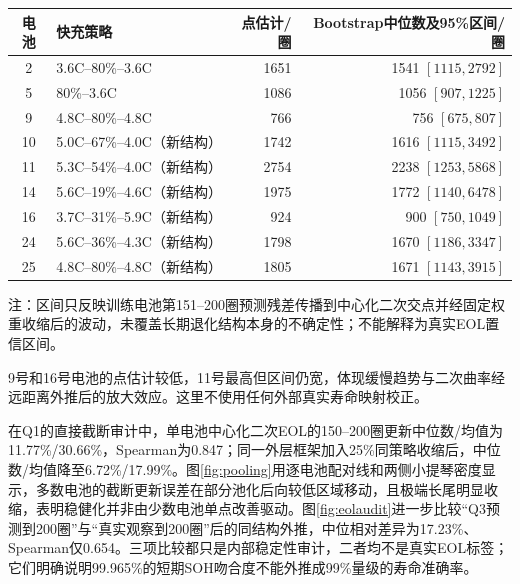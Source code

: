 \documentclass[withoutpreface]{cumcmthesis}
\begin{document}
\begin{table}[H]
\centering
\small
\begin{threeparttable}
\begin{tabular}{clrr}
\toprule
\rowcolor{TableHeader}
电池 & 快充策略 & 点估计/圈 & Bootstrap中位数及95\%区间/圈 \\
\midrule
2  & 3.6C--80\%--3.6C & 1651 & 1541 $[1115,2792]$ \\
5  & 80\%--3.6C & 1086 & 1056 $[907,1225]$ \\
9  & 4.8C--80\%--4.8C & 766 & 756 $[675,807]$ \\
10 & 5.0C--67\%--4.0C（新结构） & 1742 & 1616 $[1115,3492]$ \\
11 & 5.3C--54\%--4.0C（新结构） & 2754 & 2238 $[1253,5868]$ \\
14 & 5.6C--19\%--4.6C（新结构） & 1975 & 1772 $[1140,6478]$ \\
16 & 3.7C--31\%--5.9C（新结构） & 924 & 900 $[750,1049]$ \\
24 & 5.6C--36\%--4.3C（新结构） & 1798 & 1670 $[1186,3347]$ \\
25 & 4.8C--80\%--4.8C（新结构） & 1805 & 1671 $[1143,3915]$ \\
\bottomrule
\end{tabular}
\begin{tablenotes}
\footnotesize
\item 注：区间只反映训练电池第151--200圈预测残差传播到中心化二次交点并经固定权重收缩后的波动，未覆盖长期退化结构本身的不确定性；不能解释为真实EOL置信区间。
\end{tablenotes}
\end{threeparttable}
\label{tab:testlife}
\end{table}

9号和16号电池的点估计较低，11号最高但区间仍宽，体现缓慢趋势与二次曲率经远距离外推后的放大效应。这里不使用任何外部真实寿命映射校正。

在Q1的直接截断审计中，单电池中心化二次EOL的150--200圈更新中位数/均值为11.77\%/30.66\%，Spearman为0.847；同一外层框架加入25\%同策略收缩后，中位数/均值降至6.72\%/17.99\%。图\ref{fig:pooling}用逐电池配对线和两侧小提琴密度显示，多数电池的截断更新误差在部分池化后向较低区域移动，且极端长尾明显收缩，表明稳健化并非由少数电池单点改善驱动。图\ref{fig:eolaudit}进一步比较“Q3预测到200圈”与“真实观察到200圈”后的同结构外推，中位相对差异为17.23\%、Spearman仅0.654。三项比较都只是内部稳定性审计，二者均不是真实EOL标签；它们明确说明99.965\%的短期SOH吻合度不能外推成99\%量级的寿命准确率。
\end{document}
